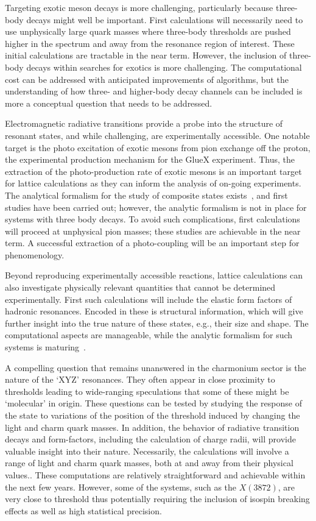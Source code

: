 Targeting exotic meson decays is more challenging, particularly because three-body decays might well be important. First calculations will necessarily need to use unphysically large quark masses where three-body thresholds are pushed higher in the spectrum and away from the resonance region of interest.
These initial calculations are tractable in the near term. However, the inclusion of three-body decays within searches for exotics is more challenging. The computational cost can be addressed with anticipated improvements of algorithms, but the understanding of how three- and higher-body decay channels can be included is more a conceptual question that needs to be addressed.

Electromagnetic radiative transitions provide a probe into the structure of resonant states, and while challenging, are experimentally accessible. 
One notable target is the photo excitation of exotic mesons from pion exchange off the proton, the experimental production mechanism for the GlueX experiment. Thus, the extraction of the photo-production rate of exotic mesons is an important target for lattice calculations as they can inform the analysis of on-going experiments. The analytical formalism for the study of composite states exists~\cite{Briceno:2015tza}, and first studies have been carried out; however, the analytic formalism is not in place for systems with three body decays. To avoid such complications, first calculations will proceed at unphysical pion masses;  these studies are achievable in the near term. A successful extraction of a photo-coupling will be an important step for phenomenology.

Beyond reproducing experimentally accessible reactions, lattice calculations can also investigate physically relevant quantities that cannot be determined experimentally. First such calculations will include the elastic form factors of hadronic resonances. Encoded in these is structural information, which will give further insight into the true nature of these states, e.g., their size and shape. The computational aspects are manageable, while the analytic formalism for such systems is maturing~\cite{Briceno:2015tza,Baroni:2018iau}.


A compelling question that remains unanswered in the charmonium sector is the nature of the `XYZ' resonances. They often appear in close proximity to thresholds leading to wide-ranging speculations that some of these might be `molecular' in origin. These questions can be tested by studying the response of the state to variations of the position of the threshold induced by changing the light and charm quark masses. In addition, the behavior of radiative transition decays and form-factors, including the calculation of charge radii, will provide valuable insight into their nature. Necessarily, the calculations will involve a range of light and charm quark masses, both at and away from their physical values..  These computations are relatively straightforward and achievable within the next few years. However, some of the systems, such as the $X(3872)$, are very close to threshold thus potentially requiring the inclusion of isospin breaking effects as well as high statistical precision.


